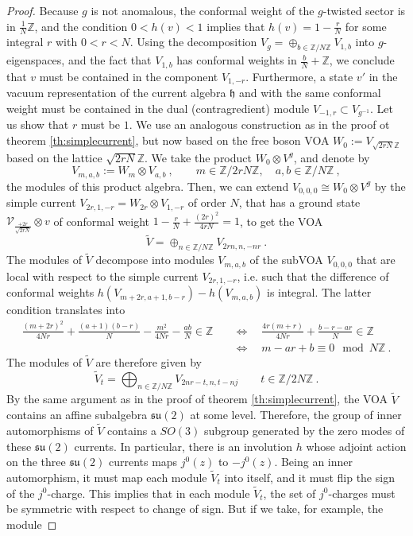 \documentclass[11pt,reqno]{article}
\newcommand{\be}{\begin{equation}}
\newcommand{\ee}{\end{equation}}
\newcommand{\CV}{\mathcal{V}}
\newcommand{\ZZ}{\mathbb{Z}}
\newcommand{\alg}[1]{\mathfrak{#1}}
\begin{document}
\begin{proof}
Because $g$ is not anomalous, the conformal weight of the $g$-twisted sector is in $\frac{1}{N}\ZZ$, and the condition $0<h(v)<1$ implies that $h(v)=1-\frac{r}{N}$ for some integral $r$ with $0<r<N$. Using the decomposition $V_g=\oplus_{b\in \ZZ/N\ZZ} V_{1,b}$ into $g$-eigenspaces, and the fact that $V_{1,b}$ has conformal weights in $\frac{b}{N}+\ZZ$, we conclude that $v$ must be contained in the component $V_{1,-r}$. Furthermore, a state $v'$ in the vacuum representation of the current algebra $\alg{h}$ and with the same conformal weight must be contained in the dual (contragredient) module $V_{-1,r}\subset V_{g^{-1}}$. Let us show that $r$ must be $1$. We  use an analogous construction as in the proof ot theorem \ref{th:simplecurrent}, but now based on the free boson VOA $W_0:=V_{\sqrt{2rN}\ZZ}$ based on the lattice $\sqrt{2rN}\ZZ$. We take the product $W_0\otimes V^g$, and denote by
\be V_{m,a,b}:=W_m\otimes V_{a,b}\ ,\qquad m\in \ZZ/2rN\ZZ,\quad a,b\in \ZZ/N\ZZ\ ,
\ee the modules of this product algebra. Then, we can extend $V_{0,0,0}\cong W_0\otimes V^g$ by the simple current $V_{2r,1,-r}=W_{2r}\otimes V_{1,-r}$ of order $N$, that has a ground state $\CV_{\frac{+2r}{\sqrt{2rN}}}\otimes v$ of conformal weight $1-\frac{r}{N}+\frac{(2r)^2}{4rN}=1$, to get the VOA
\be \tilde V=\oplus_{n\in \ZZ/N\ZZ} V_{2rn, n,-nr}\ .
\ee The modules of $\tilde V$ decompose into modules $V_{m,a,b}$ of the subVOA $V_{0,0,0}$ that are local with respect to the simple current $V_{2r,1,-r}$, i.e. such that the difference of conformal weights $h(V_{m+2r,a+1,b-r})-h(V_{m,a,b})$ is integral. The latter condition translates into
\begin{align} \frac{(m+2r)^2}{4Nr}+\frac{(a+1)(b-r)}{N}- \frac{m^2}{4Nr}-\frac{ab}{N}\in \ZZ \quad &\Leftrightarrow \quad \frac{4r(m+r)}{4Nr}+\frac{b-r-ar}{N}\in \ZZ  \\ &\Leftrightarrow \quad  m-ar+b\equiv 0\mod N\ZZ\ .
\end{align} The modules of $\tilde V$ are therefore given by
\be \tilde V_t=\bigoplus_{n\in \ZZ/N\ZZ} V_{2nr-t,n,t-nj}\qquad t\in \ZZ/2N\ZZ\ .
\ee By the same argument as in the proof of theorem \ref{th:simplecurrent}, the VOA $\tilde V$ contains an affine subalgebra $\alg{su}(2)$ at some level. Therefore, the group of inner automorphisms of $\tilde V$ contains a $SO(3)$ subgroup generated by the zero modes of these $\alg{su}(2)$ currents. In particular, there is an involution $h$ whose adjoint action on the three $\alg{su}(2)$ currents  maps $j^0(z)$ to $-j^0(z)$. Being an inner automorphism, it must map each module $\tilde V_t$ into itself, and it must flip the sign of the $j^0$-charge. This implies that in each module $\tilde V_t$, the set of $j^0$-charges must be symmetric with respect to change of sign. But if we take, for example, the module

\end{proof}
\end{document}
